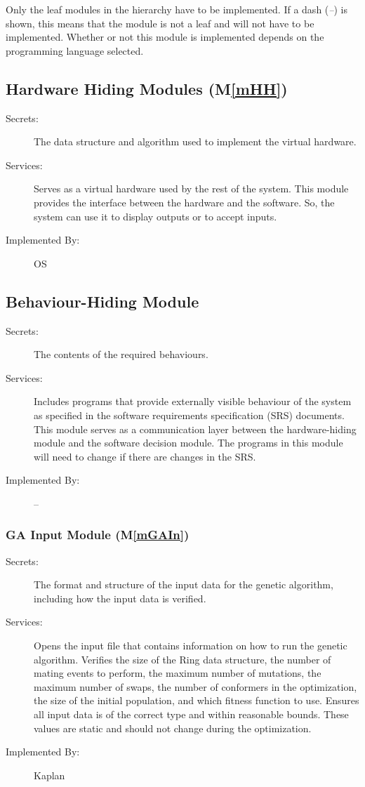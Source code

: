\documentclass[12pt, titlepage]{article}
\newcommand{\mref}[1]{M\ref{#1}}
\newcommand{\progname}{Kaplan} %
\begin{document}
Only the leaf modules in the
hierarchy have to be implemented. If a dash (\emph{--}) is shown, this means
that the module is not a leaf and will not have to be implemented. Whether or
not this module is implemented depends on the programming language
selected.

\subsection{Hardware Hiding Modules (\mref{mHH})}

\begin{description}
\item[Secrets:]The data structure and algorithm used to implement the virtual
  hardware.
\item[Services:]Serves as a virtual hardware used by the rest of the
  system. This module provides the interface between the hardware and the
  software. So, the system can use it to display outputs or to accept inputs.
\item[Implemented By:] OS
\end{description}

\subsection{Behaviour-Hiding Module}

\begin{description}
\item[Secrets:]The contents of the required behaviours.
\item[Services:]Includes programs that provide externally visible behaviour of
  the system as specified in the software requirements specification (SRS)
  documents. This module serves as a communication layer between the
  hardware-hiding module and the software decision module. The programs in this
  module will need to change if there are changes in the SRS.
\item[Implemented By:] --
\end{description}

\subsubsection{GA Input Module (\mref{mGAIn})}

\begin{description}
\item[Secrets:] The format and structure of the input data for the genetic 
algorithm, including how the input data is verified.
\item[Services:] Opens the input file that contains information on how to run 
the genetic algorithm. Verifies the size of the Ring data structure, the number 
of mating events to perform, the maximum number of mutations, the maximum 
number of swaps, the number of conformers in the optimization, the size of the 
initial population, and which fitness function to use. Ensures 
all input data is of the correct type and within reasonable 
bounds. These values are static and should not change during the optimization.
\item[Implemented By:] \progname{}
\end{description}
\end{document}
